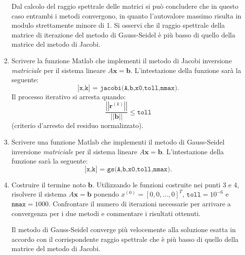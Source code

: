 \begin{enumerate}
    Dal calcolo del raggio spettrale delle matrici si può concludere che in questo caso entrambi i metodi convergono, in quanto l'autovalore massimo risulta in modulo strettamente minore di 1. Si osservi che il raggio spettrale della matrice di iterazione del metodo di Gauss-Seidel è più basso di quello della matrice del metodo di Jacobi.

    \item Scrivere la funzione Matlab che implementi il metodo di Jacobi inversione \emph{matriciale} per il sistema lineare $A\mathbf{x} = \mathbf{b}$. L'intestazione della funzione sarà la seguente:
    \begin{equation*}
        \texttt{[x,k] = jacobi(A,b,x0,toll,nmax).}
    \end{equation*}
    Il processo iterativo si arresta quando:
    \begin{equation*}
        \dfrac{\left|\left|\mathbf{r}^{(k)}\right|\right|}{\left|\left|\mathbf{b}\right|\right|} \leq \texttt{toll}
    \end{equation*}
    (criterio d'arresto del residuo normalizzato).

    

    \item Scrivere una funzione Matlab che implementi il metodo di Gauss-Seidel inversione \emph{matriciale} per il sistema lineare $A\mathbf{x} = \mathbf{b}$. L'intestazione della funzione sarà la seguente:
    \begin{equation*}
        \texttt{[x,k] = gs(A,b,x0,toll,nmax).}
    \end{equation*}

    

    \item Costruire il termine noto $\mathbf{b}$. Utilizzando le funzioni costruite nei punti 3 e 4, risolvere il sistema $A\mathbf{x} = \mathbf{b}$ ponendo $x^{(0)} = \left[0,0,\dots,0\right]^{T}$, $\texttt{toll} = 10^{-6}$ e $\texttt{nmax} = 1000$. Confrontare il numero di iterazioni necessarie per arrivare a convergenza per i due metodi e commentare i risultati ottenuti.
    
    Il metodo di Gauss-Seidel converge più velocemente alla soluzione esatta in accordo con il corrispondente raggio spettrale che è più basso di quello della matrice del metodo di Jacobi.
    
\end{enumerate}

